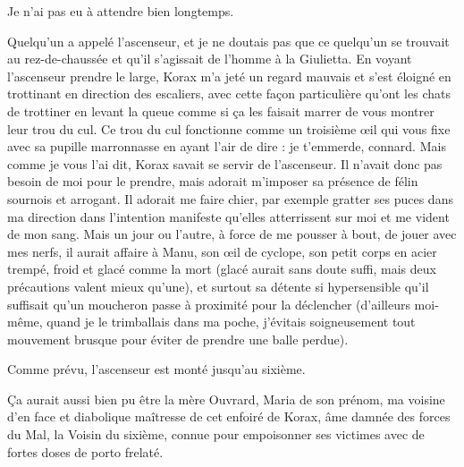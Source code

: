 Je n’ai pas eu à attendre bien longtemps.

Quelqu’un a appelé l’ascenseur, et je ne doutais pas que ce quelqu’un se trouvait au rez-de-chaussée et qu’il s’agissait de l’homme à la Giulietta. En voyant l’ascenseur prendre le large, Korax m’a jeté un regard mauvais et s’est éloigné en trottinant en direction des escaliers, avec cette façon particulière qu’ont les chats de trottiner en levant la queue comme si ça les faisait marrer de vous montrer leur trou du cul. Ce trou du cul fonctionne comme un troisième œil qui vous fixe avec sa pupille marronnasse en ayant l’air de dire : je t’emmerde, connard. Mais comme je vous l’ai dit, Korax savait se servir de l’ascenseur. Il n’avait donc pas besoin de moi pour le prendre, mais adorait m’imposer sa présence de félin sournois et arrogant. Il adorait me faire chier, par exemple gratter ses puces dans ma direction dans l’intention manifeste qu’elles atterrissent sur moi et me vident de mon sang. Mais un jour ou l’autre, à force de me pousser à bout, de jouer avec mes nerfs, il aurait affaire à Manu, son œil de cyclope, son petit corps en acier trempé, froid et glacé comme la mort (glacé aurait sans doute suffi, mais deux précautions valent mieux qu’une), et surtout sa détente si hypersensible qu’il suffisait qu’un moucheron passe à proximité pour la déclencher (d’ailleurs moi-même, quand je le trimballais dans ma poche, j’évitais soigneusement tout mouvement brusque pour éviter de prendre une balle perdue).

Comme prévu, l’ascenseur est monté jusqu’au sixième.

Ça aurait aussi bien pu être la mère Ouvrard, Maria de son prénom, ma voisine d’en face et diabolique maîtresse de cet enfoiré de Korax, âme damnée des forces du Mal, la Voisin du sixième, connue pour empoisonner ses victimes avec de fortes doses de porto frelaté.

